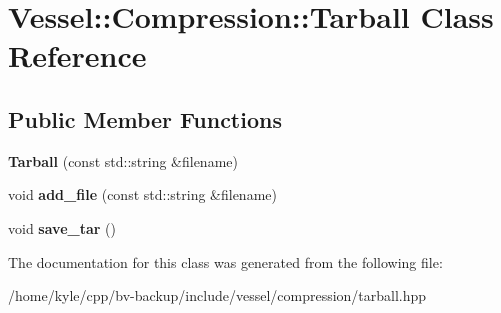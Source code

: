 \hypertarget{class_vessel_1_1_compression_1_1_tarball}{}\section{Vessel\+:\+:Compression\+:\+:Tarball Class Reference}
\label{class_vessel_1_1_compression_1_1_tarball}
\subsection*{Public Member Functions}
\begin{DoxyCompactItemize}
\item 
\mbox{\label{class_vessel_1_1_compression_1_1_tarball_a81c6c75d0b9ff0670e4c6793818d16d4}} 
{\bfseries Tarball} (const std\+::string \&filename)
\item 
\mbox{\label{class_vessel_1_1_compression_1_1_tarball_a15bb8690a84b83808ed9894258cfa1ee}} 
void {\bfseries add\+\_\+file} (const std\+::string \&filename)
\item 
\mbox{\label{class_vessel_1_1_compression_1_1_tarball_a2655faae4e6c34d8e610561e9ea0651d}} 
void {\bfseries save\+\_\+tar} ()
\end{DoxyCompactItemize}


The documentation for this class was generated from the following file\+:\begin{DoxyCompactItemize}
\item 
/home/kyle/cpp/bv-\/backup/include/vessel/compression/tarball.\+hpp\end{DoxyCompactItemize}
